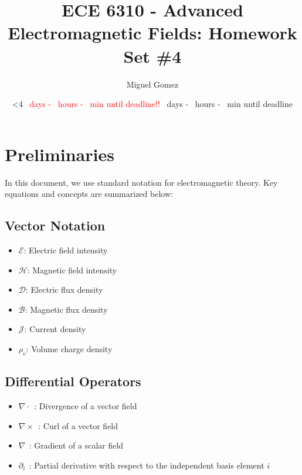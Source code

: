 \documentclass[12pt]{article}
\newcommand{\TimeUntilDue}{
  \ifnum\daystilldue<4
    \textcolor{red}{
    \number\daystilldue\ days - 
    \number\hourstilldue\ hours - 
    \number\minutestilldue\ min until deadline!!
  }
\else
    \number\daystilldue\ days - 
    \number\hourstilldue\ hours - 
    \number\minutestilldue\ min until deadline
  \fi
}
\begin{document}
\newcommand{\Cross}[2]{
\hat a_x(#1_2#2_3 -#1_3#2_2) -\hat a_y(#1_1#2_3-#1_3#2_1) + \hat a_z(#1_1#2_2-#1_2#2_1) 
}
\title{ECE 6310 - Advanced Electromagnetic Fields: Homework Set \#4}
\author{Miguel Gomez}
\date{\TimeUntilDue}
\maketitle

\section*{Preliminaries}
In this document, we use standard notation for electromagnetic theory. Key equations and concepts are summarized below:

\subsection*{Vector Notation}
\begin{itemize}
  \item $\bm{\mathcal{E}}$: Electric field intensity
  \item $\bm{\mathcal{H}}$: Magnetic field intensity
  \item $\bm{\mathcal{D}}$: Electric flux density
  \item $\bm{\mathcal{B}}$: Magnetic flux density
  \item $\bm{\mathcal{J}}$: Current density
  \item $\rho_v$: Volume charge density
\end{itemize}

\subsection*{Differential Operators}
\begin{itemize}
  \item $\nabla \cdot\ \ $: Divergence of a vector field
  \item $\nabla \times\ \ $: Curl of a vector field
  \item $\nabla\ \ $: Gradient of a scalar field
  \item $\partial_i\ \ $: Partial derivative with respect to the independent basis element $i$
\end{itemize}
\end{document}
